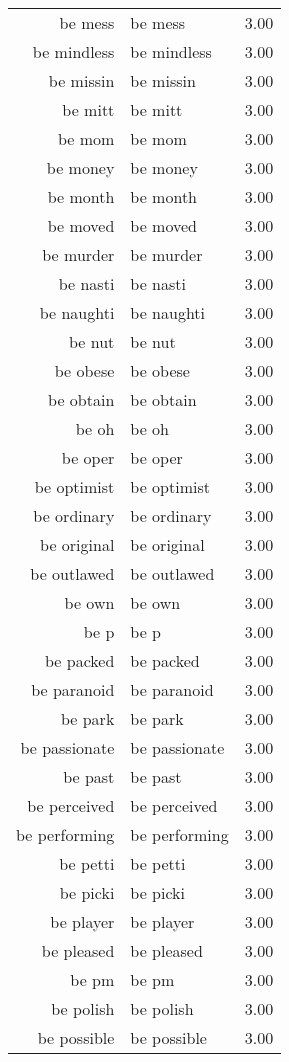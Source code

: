 \begin{table}[ht]
\begin{tabular}{rlr}
  be mess & be mess & 3.00 \\ 
  be mindless & be mindless & 3.00 \\ 
  be missin & be missin & 3.00 \\ 
  be mitt & be mitt & 3.00 \\ 
  be mom & be mom & 3.00 \\ 
  be money & be money & 3.00 \\ 
  be month & be month & 3.00 \\ 
  be moved & be moved & 3.00 \\ 
  be murder & be murder & 3.00 \\ 
  be nasti & be nasti & 3.00 \\ 
  be naughti & be naughti & 3.00 \\ 
  be nut & be nut & 3.00 \\ 
  be obese & be obese & 3.00 \\ 
  be obtain & be obtain & 3.00 \\ 
  be oh & be oh & 3.00 \\ 
  be oper & be oper & 3.00 \\ 
  be optimist & be optimist & 3.00 \\ 
  be ordinary & be ordinary & 3.00 \\ 
  be original & be original & 3.00 \\ 
  be outlawed & be outlawed & 3.00 \\ 
  be own & be own & 3.00 \\ 
  be p & be p & 3.00 \\ 
  be packed & be packed & 3.00 \\ 
  be paranoid & be paranoid & 3.00 \\ 
  be park & be park & 3.00 \\ 
  be passionate & be passionate & 3.00 \\ 
  be past & be past & 3.00 \\ 
  be perceived & be perceived & 3.00 \\ 
  be performing & be performing & 3.00 \\ 
  be petti & be petti & 3.00 \\ 
  be picki & be picki & 3.00 \\ 
  be player & be player & 3.00 \\ 
  be pleased & be pleased & 3.00 \\ 
  be pm & be pm & 3.00 \\ 
  be polish & be polish & 3.00 \\ 
  be possible & be possible & 3.00 \\ 

\end{tabular}
\end{table}
